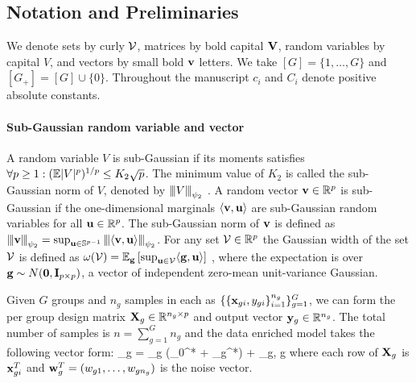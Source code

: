 \subsection{Notation and Preliminaries}
We denote sets by curly $\cV$, matrices by bold capital $\mathbf{V}$, random variables by capital $V$, and vectors by small bold $\mathbf{v}$ letters.
We take $[G] = \{1, \dots, G\}$ and $[G_+] = [G] \cup \{0\}$. Throughout the manuscript $c_i$ and $C_i$ denote positive absolute constants.

\paragraph{Sub-Gaussian random variable and vector}
A random variable $V$ is sub-Gaussian if its moments satisfies $\forall p \geq 1: (\mathbb{E} |V|^p )^{1/p} \leq K_2 \sqrt{p}$.
The minimum value of $K_2$ is called the sub-Gaussian  norm of $V$, denoted by ${\left\vert\kern-0.25ex\left\vert\kern-0.25ex\left\vert V \right\vert\kern-0.25ex\right\vert\kern-0.25ex\right\vert}_{\psi_2}$ \cite{vers12}.
A random vector $\mathbf{v} \in \mathbb R^p$ is sub-Gaussian if the one-dimensional marginals $\langle \mathbf{v}, \mathbf{u} \rangle$ are sub-Gaussian random variables for all $\mathbf{u} \in \mathbb R^p$. The sub-Gaussian norm of $\mathbf{v}$ is defined \cite{vers12} as ${\left\vert\kern-0.25ex\left\vert\kern-0.25ex\left\vert \mathbf{v} \right\vert\kern-0.25ex\right\vert\kern-0.25ex\right\vert}_{\psi_2} = \sup_{\mathbf{u} \in \mathbb S^{p-1}} {\left\vert\kern-0.25ex\left\vert\kern-0.25ex\left\vert \langle \mathbf{v}, \mathbf{u} \rangle \right\vert\kern-0.25ex\right\vert\kern-0.25ex\right\vert}_{\psi_2}$.
For any set $\cV \in \reals^p$ the Gaussian width of the set $\cV$ is defined as $\omega(\cV) = \ex_\g \left[ \sup_{\u \in \cV} \langle \g, \u \rangle \right]$ \cite{vershynin2018high}, where the expectation is over $\mathbf{g} \sim N(\mathbf{0}, \mathbf{I}_{p \times p})$, a vector of independent zero-mean unit-variance Gaussian.

Given $G$ groups and $n_g$ samples in each as $\{ \{\mathbf{x}_{gi}, y_{gi} \}_{i=1}^{n_g} \}_{g = 1}^G$, we can form the per group design matrix $\mathbf{X}_g \in \mathbb R^{n_g \times p}$ and output vector $\mathbf{y}_g \in \mathbb R ^{n_g}$.
The total number of samples is  $n = \sum_{g = 1}^{G} n_g$ and the data enriched model takes the following vector form:
\be
\label{eq:dirtymodel}
\y_g = \X_g (\bbeta _0^* + \bbeta _g^*) + \w_g,  \quad \forall g \in [G]
\ee
where each row of $\mathbf{X}_g$ is $\mathbf{x}_{gi}^T$ and $\mathbf{w}_g^T = (w_{g1}, \dots, w_{gn_g})$ is the noise vector.





